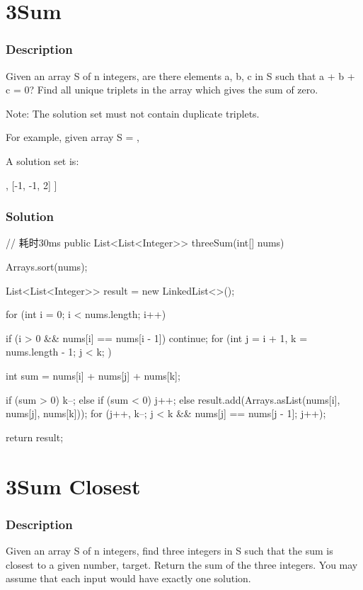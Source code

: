 \newpage

\section{3Sum} %

\subsubsection{Description}
Given an array S of n integers, are there elements a, b, c in S such that a + b + c = 0? Find all unique triplets in the array which gives the sum of zero.

Note: The solution set must not contain duplicate triplets.

For example, given array S = \code{[-1, 0, 1, 2, -1, -4]},

A solution set is:
\begin{Code}
[
  [-1, 0, 1],
  [-1, -1, 2]
]
\end{Code}

\subsubsection{Solution}

\begin{Code}
// 耗时30ms
public List<List<Integer>> threeSum(int[] nums) {
    Arrays.sort(nums);

    List<List<Integer>> result = new LinkedList<>();

    for (int i = 0; i < nums.length; i++) {
        if (i > 0 && nums[i] == nums[i - 1]) {
            continue;
        }
        for (int j = i + 1, k = nums.length - 1; j < k; ) {
            int sum = nums[i] + nums[j] + nums[k];

            if (sum > 0) {
                k--;
            } else if (sum < 0) {
                j++;
            } else {
                result.add(Arrays.asList(nums[i], nums[j], nums[k]));
                for (j++, k--; j < k && nums[j] == nums[j - 1]; j++);
            }
        }
    }

    return result;
}
\end{Code}

\newpage

\section{3Sum Closest} %

\subsubsection{Description}
Given an array S of n integers, find three integers in S such that the sum is closest to a given number, target. Return the sum of the three integers. You may assume that each input would have exactly one solution.

